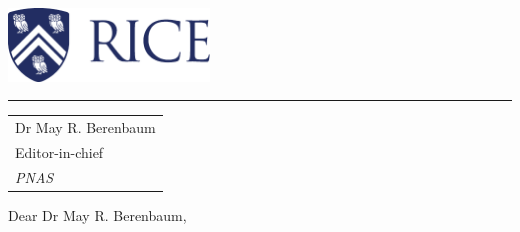 \documentclass{article}
\begin{document}

\includegraphics[width=0.4\textwidth]{Rice_Logo_280_Blue.pdf} %

\vspace{-1em} %

\rule{\linewidth}{1pt} %

\bigskip\bigskip %



\bigskip %


\begin{tabular}{@{} l}
	Dr May R. Berenbaum \\
	Editor-in-chief \\
	\textit{PNAS}
\end{tabular}

\bigskip %

Dear Dr May R. Berenbaum,

\bigskip %

\end{document}
